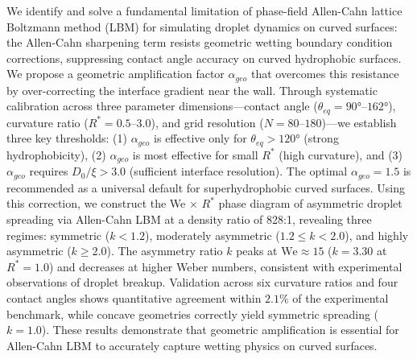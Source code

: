 We identify and solve a fundamental limitation of phase-field Allen-Cahn lattice Boltzmann method (LBM) for simulating droplet dynamics on curved surfaces: the Allen-Cahn sharpening term resists geometric wetting boundary condition corrections, suppressing contact angle accuracy on curved hydrophobic surfaces. We propose a geometric amplification factor $\alpha_{geo}$ that overcomes this resistance by over-correcting the interface gradient near the wall. Through systematic calibration across three parameter dimensions---contact angle ($\theta_{eq} = 90°$--$162°$), curvature ratio ($R^* = 0.5$--$3.0$), and grid resolution ($N = 80$--$180$)---we establish three key thresholds: (1) $\alpha_{geo}$ is effective only for $\theta_{eq} > 120°$ (strong hydrophobicity), (2) $\alpha_{geo}$ is most effective for small $R^*$ (high curvature), and (3) $\alpha_{geo}$ requires $D_0/\xi > 3.0$ (sufficient interface resolution). The optimal $\alpha_{geo} = 1.5$ is recommended as a universal default for superhydrophobic curved surfaces. Using this correction, we construct the We $\times$ $R^*$ phase diagram of asymmetric droplet spreading via Allen-Cahn LBM at a density ratio of 828:1, revealing three regimes: symmetric ($k < 1.2$), moderately asymmetric ($1.2 \leq k < 2.0$), and highly asymmetric ($k \geq 2.0$). The asymmetry ratio $k$ peaks at $\mathrm{We} \approx 15$ ($k = 3.30$ at $R^*=1.0$) and decreases at higher Weber numbers, consistent with experimental observations of droplet breakup. Validation across six curvature ratios and four contact angles shows quantitative agreement within $2.1\%$ of the experimental benchmark, while concave geometries correctly yield symmetric spreading ($k=1.0$). These results demonstrate that geometric amplification is essential for Allen-Cahn LBM to accurately capture wetting physics on curved surfaces.
